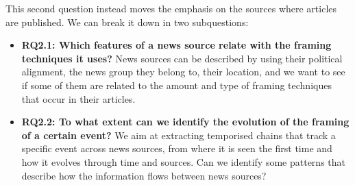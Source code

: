 \vspace{12px}

This second question instead moves the emphasis on the sources where articles are published. We can break it down in two subquestions:

\begin{itemize}
    \item \textbf{RQ2.1: Which features of a news source relate with the framing techniques it uses?}
    News sources can be described by using their political alignment, the news group they belong to, their location, and we want to see if some of them are related to the amount and type of framing techniques that occur in their articles.
    
    \item \textbf{RQ2.2: To what extent can we identify the evolution of the framing of a certain event?}
    We aim at extracting temporised chains that track a specific event across news sources, from where it is seen the first time and how it evolves through time and sources.
    Can we identify some patterns that describe how the information flows between news sources?
    
    
    
\end{itemize}
